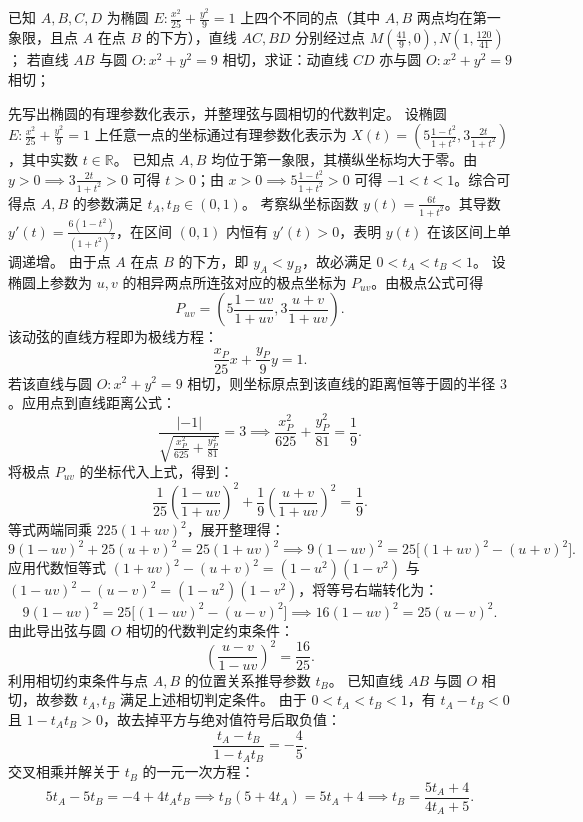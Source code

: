 \begin{example}
已知 \(A,B,C,D\) 为椭圆 \(E: \frac{x^2}{25} + \frac{y^2}{9} = 1\) 上四个不同的点（其中 \(A,B\) 两点均在第一象限，且点 \(A\) 在点 \(B\) 的下方），直线 \(AC,BD\) 分别经过点 \(M\left(\frac{41}{9},0\right),N\left(1,\frac{120}{41}\right)\)；
若直线 \(AB\) 与圆 \(O: x^2 + y^2 = 9\) 相切，求证：动直线 \(CD\) 亦与圆 \(O: x^2 + y^2 = 9\) 相切；
\end{example}
\begin{solution}
先写出椭圆的有理参数化表示，并整理弦与圆相切的代数判定。
设椭圆 $E: \frac{x^2}{25} + \frac{y^2}{9} = 1$ 上任意一点的坐标通过有理参数化表示为 $X(t) = \left( 5\frac{1-t^2}{1+t^2}, 3\frac{2t}{1+t^2} \right)$，其中实数 $t \in \mathbb{R}$。
已知点 $A, B$ 均位于第一象限，其横纵坐标均大于零。由 $y > 0 \implies 3\frac{2t}{1+t^2} > 0$ 可得 $t > 0$；由 $x > 0 \implies 5\frac{1-t^2}{1+t^2} > 0$ 可得 $-1 < t < 1$。综合可得点 $A, B$ 的参数满足 $t_A, t_B \in (0, 1)$。
考察纵坐标函数 $y(t) = \frac{6t}{1+t^2}$。其导数 $y'(t) = \frac{6(1-t^2)}{(1+t^2)^2}$，在区间 $(0, 1)$ 内恒有 $y'(t) > 0$，表明 $y(t)$ 在该区间上单调递增。
由于点 $A$ 在点 $B$ 的下方，即 $y_A < y_B$，故必满足 $0 < t_A < t_B < 1$。
设椭圆上参数为 $u, v$ 的相异两点所连弦对应的极点坐标为 $P_{uv}$。由极点公式可得
\[ P_{uv} = \left( 5\frac{1-uv}{1+uv}, 3\frac{u+v}{1+uv} \right). \]
该动弦的直线方程即为极线方程：
\[ \frac{x_P}{25}x + \frac{y_P}{9}y = 1. \]
若该直线与圆 $O: x^2+y^2=9$ 相切，则坐标原点到该直线的距离恒等于圆的半径 $3$。应用点到直线距离公式：
\[ \frac{|-1|}{\sqrt{\frac{x_P^2}{625} + \frac{y_P^2}{81}}} = 3 \implies \frac{x_P^2}{625} + \frac{y_P^2}{81} = \frac{1}{9}. \]
将极点 $P_{uv}$ 的坐标代入上式，得到：
\[ \frac{1}{25}\left(\frac{1-uv}{1+uv}\right)^2 + \frac{1}{9}\left(\frac{u+v}{1+uv}\right)^2 = \frac{1}{9}. \]
等式两端同乘 $225(1+uv)^2$，展开整理得：
\[ 9(1-uv)^2 + 25(u+v)^2 = 25(1+uv)^2 \implies 9(1-uv)^2 = 25\big[(1+uv)^2 - (u+v)^2\big]. \]
应用代数恒等式 $(1+uv)^2 - (u+v)^2 = (1-u^2)(1-v^2)$ 与 $(1-uv)^2 - (u-v)^2 = (1-u^2)(1-v^2)$，将等号右端转化为：
\[ 9(1-uv)^2 = 25\big[(1-uv)^2 - (u-v)^2\big] \implies 16(1-uv)^2 = 25(u-v)^2. \]
由此导出弦与圆 $O$ 相切的代数判定约束条件：
\[ \left( \frac{u-v}{1-uv} \right)^2 = \frac{16}{25}. \]
利用相切约束条件与点 $A,B$ 的位置关系推导参数 $t_B$。
已知直线 $AB$ 与圆 $O$ 相切，故参数 $t_A, t_B$ 满足上述相切判定条件。
由于 $0 < t_A < t_B < 1$，有 $t_A - t_B < 0$ 且 $1 - t_A t_B > 0$，故去掉平方与绝对值符号后取负值：
\[ \frac{t_A - t_B}{1 - t_A t_B} = -\frac{4}{5}. \]
交叉相乘并解关于 $t_B$ 的一元一次方程：
\[ 5t_A - 5t_B = -4 + 4t_A t_B \implies t_B(5 + 4t_A) = 5t_A + 4 \implies t_B = \frac{5t_A + 4}{4t_A + 5}. \]

\end{solution}
